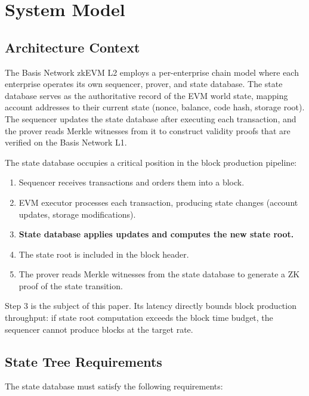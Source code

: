 \section{System Model}
\label{sec:system-model}

\subsection{Architecture Context}

The Basis Network zkEVM L2 employs a per-enterprise chain model
where each enterprise operates its own sequencer, prover, and state
database. The state database serves as the authoritative record of
the EVM world state, mapping account addresses to their
current state (nonce, balance, code hash, storage root). The
sequencer updates the state database after executing each
transaction, and the prover reads Merkle witnesses from it to
construct validity proofs that are verified on the Basis Network L1.

The state database occupies a critical position in the block
production pipeline:

\begin{enumerate}
  \item Sequencer receives transactions and orders them into a block.
  \item EVM executor processes each transaction, producing state
    changes (account updates, storage modifications).
  \item \textbf{State database applies updates and computes the new
    state root.}
  \item The state root is included in the block header.
  \item The prover reads Merkle witnesses from the state database
    to generate a ZK proof of the state transition.
\end{enumerate}

Step 3 is the subject of this paper. Its latency directly bounds
block production throughput: if state root computation exceeds the
block time budget, the sequencer cannot produce blocks at the target
rate.

\subsection{State Tree Requirements}

The state database must satisfy the following requirements:

